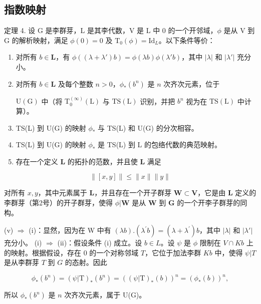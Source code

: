 \subsection{指数映射}

定理 4. 设 G 是李群芽，L 是其李代数，V 是 L 中 0 的一个开邻域，\(\phi\) 是从 V 到 G 的解析映射，满足 \(\phi(0) = 0\) 及 \(\mathrm{T}_0(\phi) = \mathrm{Id}_L\)。以下条件等价：

\begin{enumerate}
\def\labelenumi{(\roman{enumi})}
\item
  对所有 \(b \in \mathbf{L}\)，有 \(\phi((\lambda + \lambda')b) = \phi(\lambda b)\phi(\lambda'b)\)，其中 \(|\lambda|\) 和 \(|\lambda'|\) 充分小。
\item
  对所有 \(b \in \mathbf{L}\) 及每个整数 \(n > 0\)，\(\phi_{*}(b^{n})\) 是 \(n\) 次齐次元素，位于

\(\mathrm{U}(\mathrm{G})\) 中（将 \(\mathrm{T}_{0}^{(\infty)}(\mathrm{L})\) 与 \(\mathrm{TS}(\mathrm{L})\) 识别，并把 \(b^{n}\) 视为在 \(\mathrm{TS}(\mathrm{L})\) 中计算）。

\item
  TS(L) 到 U(G) 的映射 \(\phi_{*}\) 与 TS(L) 和 U(G) 的分次相容。
\item
  TS(L) 到 U(G) 的映射 \(\phi_*\) 是 TS(L) 到 L 的包络代数的典范映射。
\item
  存在一个定义 \(\mathbf{L}\) 的拓扑的范数，并且使 \(\mathbf{L}\) 满足
\end{enumerate}

\[
\| [ x, y ] \| \leqslant \| x \| \| y \|
\]

对所有 \(x, y\)，其中元素属于 \(\mathbf{L}\)，并且存在一个开子群芽 \(\mathbf{W} \subset \mathbf{V}\)，它是由 \(\mathbf{L}\) 定义的李群芽（第2号）的开子群芽，使得 \(\phi | \mathbf{W}\) 是从 \(\mathbf{W}\) 到 \(\mathbf{G}\) 的一个开李子群芽的同构。

(v) \(\Rightarrow\) (i)：显然，因为在 W 中有 \((\lambda b).(\lambda^{\prime}b) = (\lambda +\lambda^{\prime})b\)，其中 \(|\lambda |\) 和 \(|\lambda '|\) 充分小。
(i) \(\Rightarrow\) (ii)：假设条件 (i) 成立。设 \(b \in L\)。设 \(\psi\) 是 \(\phi\) 限制在 \(V \cap Kb\) 上的映射。根据假设，存在 0 的一个对称邻域 \(T\)，它位于加法李群 \(Kb\) 中，使得 \(\psi|T\) 是从李群芽 \(T\) 到 \(G\) 的态射。因此

\[
\phi_ {*} (b ^ {n}) = (\psi | \mathrm{T}) _ {*} (b ^ {n}) = ((\psi | \mathrm{T}) _ {*} (b)) ^ {n} = (\phi_ {*} (b)) ^ {n},
\]

所以 \(\phi_{*}(b^{n})\) 是 \(n\) 次齐次元素，属于 U(G)。

